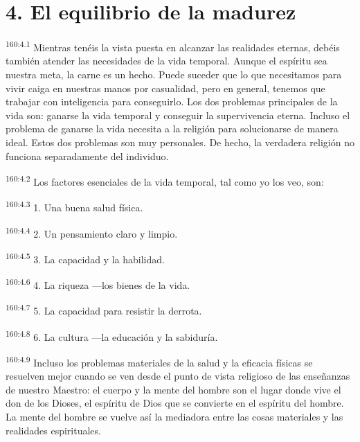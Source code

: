 \section*{4. El equilibrio de la madurez}
\par
\textsuperscript{160:4.1} Mientras tenéis la vista puesta en alcanzar las realidades eternas, debéis también atender las necesidades de la vida temporal. Aunque el espíritu sea nuestra meta, la carne es un hecho. Puede suceder que lo que necesitamos para vivir caiga en nuestras manos por casualidad, pero en general, tenemos que trabajar con inteligencia para conseguirlo. Los dos problemas principales de la vida son: ganarse la vida temporal y conseguir la supervivencia eterna. Incluso el problema de ganarse la vida necesita a la religión para solucionarse de manera ideal. Estos dos problemas son muy personales. De hecho, la verdadera religión no funciona separadamente del individuo.

\par
\textsuperscript{160:4.2} Los factores esenciales de la vida temporal, tal como yo los veo, son:

\par
\textsuperscript{160:4.3} 1. Una buena salud física.

\par
\textsuperscript{160:4.4} 2. Un pensamiento claro y limpio.

\par
\textsuperscript{160:4.5} 3. La capacidad y la habilidad.

\par
\textsuperscript{160:4.6} 4. La riqueza ---los bienes de la vida.

\par
\textsuperscript{160:4.7} 5. La capacidad para resistir la derrota.

\par
\textsuperscript{160:4.8} 6. La cultura ---la educación y la sabiduría.

\par
\textsuperscript{160:4.9} Incluso los problemas materiales de la salud y la eficacia físicas se resuelven mejor cuando se ven desde el punto de vista religioso de las enseñanzas de nuestro Maestro: el cuerpo y la mente del hombre son el lugar donde vive el don de los Dioses, el espíritu de Dios que se convierte en el espíritu del hombre. La mente del hombre se vuelve así la mediadora entre las cosas materiales y las realidades espirituales.

